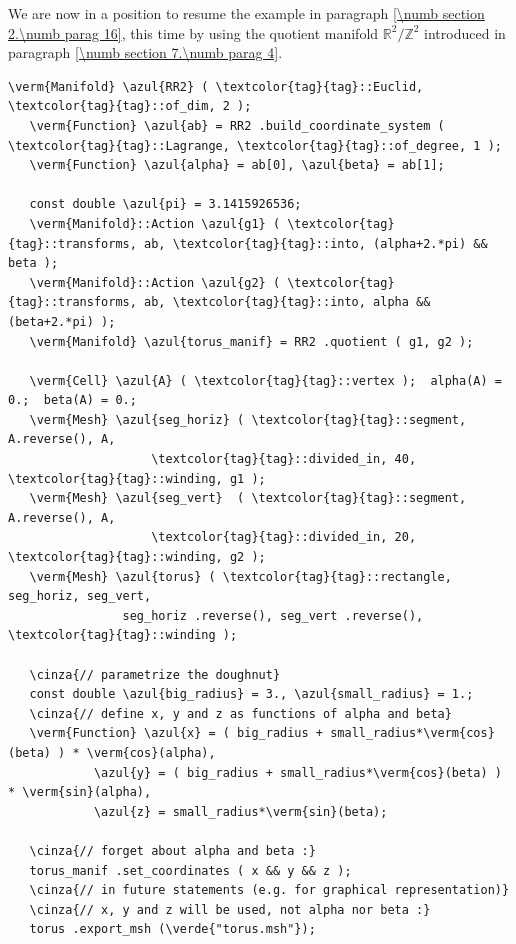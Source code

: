 We are now in a position to resume the example in paragraph \ref{\numb section 2.\numb parag 16},
this time by using the quotient manifold $ \mathbb{R}^2/{\mathbb Z}^2 $ introduced in paragraph
\ref{\numb section 7.\numb parag 4}.

\begin{Verbatim}[commandchars=\\\{\},formatcom=\small\tt,frame=single,
   label=parag-\ref{\numb section 7.\numb parag 5}.cpp,rulecolor=\color{coment},
   baselinestretch=0.94,framesep=2mm                                            ]
   \verm{Manifold} \azul{RR2} ( \textcolor{tag}{tag}::Euclid, \textcolor{tag}{tag}::of_dim, 2 );
   \verm{Function} \azul{ab} = RR2 .build_coordinate_system ( \textcolor{tag}{tag}::Lagrange, \textcolor{tag}{tag}::of_degree, 1 );
   \verm{Function} \azul{alpha} = ab[0], \azul{beta} = ab[1];

   const double \azul{pi} = 3.1415926536;
   \verm{Manifold}::Action \azul{g1} ( \textcolor{tag}{tag}::transforms, ab, \textcolor{tag}{tag}::into, (alpha+2.*pi) && beta );
   \verm{Manifold}::Action \azul{g2} ( \textcolor{tag}{tag}::transforms, ab, \textcolor{tag}{tag}::into, alpha && (beta+2.*pi) );
   \verm{Manifold} \azul{torus_manif} = RR2 .quotient ( g1, g2 );

   \verm{Cell} \azul{A} ( \textcolor{tag}{tag}::vertex );  alpha(A) = 0.;  beta(A) = 0.;
   \verm{Mesh} \azul{seg_horiz} ( \textcolor{tag}{tag}::segment, A.reverse(), A,
                    \textcolor{tag}{tag}::divided_in, 40, \textcolor{tag}{tag}::winding, g1 );
   \verm{Mesh} \azul{seg_vert}  ( \textcolor{tag}{tag}::segment, A.reverse(), A,
                    \textcolor{tag}{tag}::divided_in, 20, \textcolor{tag}{tag}::winding, g2 );
   \verm{Mesh} \azul{torus} ( \textcolor{tag}{tag}::rectangle, seg_horiz, seg_vert,
                seg_horiz .reverse(), seg_vert .reverse(), \textcolor{tag}{tag}::winding );

   \cinza{// parametrize the doughnut}
   const double \azul{big_radius} = 3., \azul{small_radius} = 1.;
   \cinza{// define x, y and z as functions of alpha and beta}
   \verm{Function} \azul{x} = ( big_radius + small_radius*\verm{cos}(beta) ) * \verm{cos}(alpha),
            \azul{y} = ( big_radius + small_radius*\verm{cos}(beta) ) * \verm{sin}(alpha),
            \azul{z} = small_radius*\verm{sin}(beta);

   \cinza{// forget about alpha and beta :}
   torus_manif .set_coordinates ( x && y && z );
   \cinza{// in future statements (e.g. for graphical representation)}
   \cinza{// x, y and z will be used, not alpha nor beta :}
   torus .export_msh (\verde{"torus.msh"});
\end{Verbatim}


